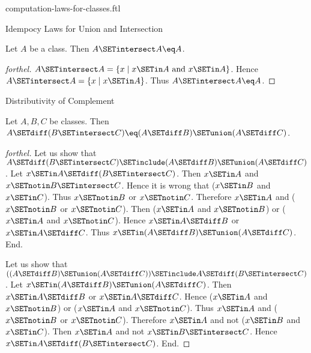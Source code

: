 \documentclass{stex}
\begin{document}
\begin{smodule}{computation-laws-for-classes.ftl}
\begin{sfragment}{Idempocy Laws for Union and Intersection}
  \begin{proposition}[forthel,id=FOUNDATIONS_02_4053144145231872]
    Let $A$ be a class.
    Then $A \SETintersect A \eq A$.
  \end{proposition}
  \begin{proof}[forthel]
    $A \SETintersect A = \{ x \mid x \SETin A\text{ and }x \SETin A \}$.
    Hence $A \SETintersect A = \{ x \mid x \SETin A \}$.
    Thus $A \SETintersect A \eq A$.
  \end{proof}
\end{sfragment}

\begin{sfragment}{Distributivity of Complement}
  \begin{proposition}[forthel,id=FOUNDATIONS_02_5296031436636160]
    Let $A, B, C$ be classes.
    Then $A \SETdiff (B \SETintersect C) \eq (A \SETdiff B) \SETunion (A \SETdiff C)$.
  \end{proposition}
  \begin{proof}[forthel]
    Let us show that $A \SETdiff (B \SETintersect C) \SETinclude (A \SETdiff B) \SETunion (A \SETdiff C)$.
      Let $x \SETin A \SETdiff (B \SETintersect C)$.
      Then $x \SETin A$ and $x \SETnotin B \SETintersect C$.
      Hence it is wrong that ($x \SETin B$ and $x \SETin C$).
      Thus $x \SETnotin B$ or $x \SETnotin C$.
      Therefore $x \SETin A$ and ($x \SETnotin B$ or $x \SETnotin C$).
      Then ($x \SETin A$ and $x \SETnotin B$) or ($x \SETin A$ and $x \SETnotin C$).
      Hence $x \SETin A \SETdiff B$ or $x \SETin A \SETdiff C$.
      Thus $x \SETin (A \SETdiff B) \SETunion (A \SETdiff C)$.
    End.

    Let us show that $((A \SETdiff B) \SETunion (A \SETdiff C)) \SETinclude A \SETdiff (B \SETintersect C)$. %
      Let $x \SETin (A \SETdiff B) \SETunion (A \SETdiff C)$.
      Then $x \SETin A \SETdiff B$ or $x \SETin A \SETdiff C$.
      Hence ($x \SETin A$ and $x \SETnotin B$) or ($x \SETin A$ and $x \SETnotin C$).
      Thus $x \SETin A$ and ($x \SETnotin B$ or $x \SETnotin C$).
      Therefore $x \SETin A$ and not ($x \SETin B$ and $x \SETin C$).
      Then $x \SETin A$ and not $x \SETin B \SETintersect C$.
      Hence $x \SETin A \SETdiff (B \SETintersect C)$.
    End.
  \end{proof}


\end{sfragment}
\end{smodule}
\end{document}
